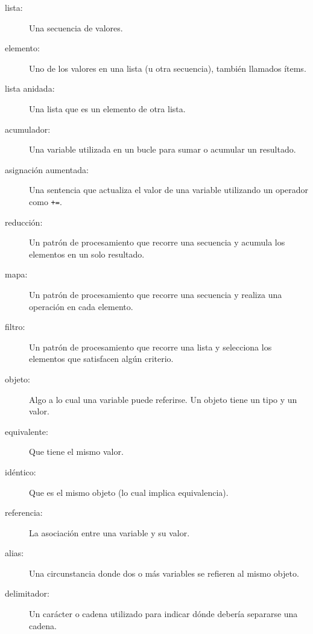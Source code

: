 \begin{description}

\item[lista:] Una secuencia de valores.

\item[elemento:] Uno de los valores en una lista (u otra secuencia),
también llamados ítems.

\item[lista anidada:] Una lista que es un elemento de otra lista.

\item[acumulador:] Una variable utilizada en un bucle para sumar o
acumular un resultado.

\item[asignación aumentada:] Una sentencia que actualiza el valor
de una variable utilizando un operador como \verb"+=".

\item[reducción:] Un patrón de procesamiento que recorre una secuencia
y acumula los elementos en un solo resultado.

\item[mapa:] Un patrón de procesamiento que recorre una secuencia y
realiza una operación en cada elemento.

\item[filtro:] Un patrón de procesamiento que recorre una lista y
selecciona los elementos que satisfacen algún criterio.

\item[objeto:] Algo a lo cual una variable puede referirse.  Un objeto
tiene un tipo y un valor.

\item[equivalente:] Que tiene el mismo valor.

\item[idéntico:] Que es el mismo objeto (lo cual implica equivalencia).

\item[referencia:] La asociación entre una variable y su valor.

\item[alias:] Una circunstancia donde dos o más variables se refieren al mismo
objeto.

\item[delimitador:] Un carácter o cadena utilizado para indicar dónde
debería separarse una cadena.

\end{description}



